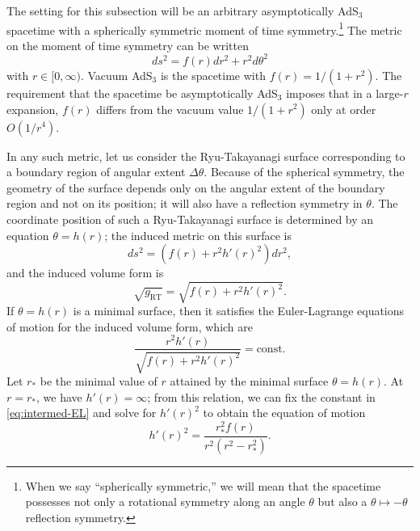 \documentclass[a4paper,11pt]{article}
\begin{document}
The setting for this subsection will be an arbitrary asymptotically AdS$_3$ spacetime with a spherically symmetric moment of time symmetry.\footnote{When we say ``spherically symmetric,'' we will mean that the spacetime possesses not only a rotational symmetry along an angle $\theta$ but also a $\theta \mapsto -\theta$ reflection symmetry.} The metric on the moment of time symmetry can be written
\begin{equation} \label{eq:spher-sym-spacetime}
    ds^2 = f(r) dr^2 + r^2 d\theta^2
\end{equation}
with $r \in [0, \infty)$. Vacuum AdS$_3$ is the spacetime with $f(r) = 1 / (1+r^2).$ The requirement that the spacetime be asymptotically AdS$_3$ imposes that in a large-$r$ expansion, $f(r)$ differs from the vacuum value $1 / (1+r^2)$ only at order $O(1/r^4)$.

In any such metric, let us consider the Ryu-Takayanagi surface corresponding to a boundary region of angular extent $\Delta \theta$. Because of the spherical symmetry, the geometry of the surface depends only on the angular extent of the boundary region and not on its position; it will also have a reflection symmetry in $\theta$. The coordinate position of such a Ryu-Takayanagi surface is determined by an equation $\theta = h(r)$; the induced metric on this surface is
\begin{equation}
    ds^2 = (f(r) + r^2 h'(r)^2) dr^2,
\end{equation}
and the induced volume form is
\begin{equation} \label{eq:volume-form}
    \sqrt{g_{\text{RT}}}
        = \sqrt{f(r) + r^2 h'(r)^2}.
\end{equation}
If $\theta = h(r)$ is a minimal surface, then it satisfies the Euler-Lagrange equations of motion for the induced volume form, which are
\begin{equation} \label{eq:intermed-EL}
    \frac{r^2 h'(r)}{\sqrt{f(r) + r^2 h'(r)^2}} = \text{const.}
\end{equation}
Let $r_*$ be the minimal value of $r$ attained by the minimal surface $\theta = h(r).$ At $r=r_*$, we have $h'(r) = \infty$; from this relation, we can fix the constant in \eqref{eq:intermed-EL} and solve for $h'(r)^2$ to obtain the equation of motion
\begin{equation} \label{eq:final-EL}
    h'(r)^2 = \frac{r_*^2 f(r)}{r^2 (r^2 - r_*^2)}.
\end{equation}
\end{document}
